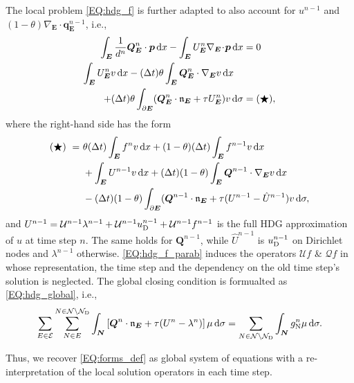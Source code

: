 \documentclass[a4paper, english, 12pt, reqno, draft]{amsart}
\theoremstyle{definition}
\theoremstyle{remark}
\numberwithin{equation}{section}
\newcommand{\setEdge}{\ensuremath{\mathcal E}}
\newcommand{\setNode}{\ensuremath{\mathcal N}}
\newcommand{\setNodeDir}{\ensuremath{\setNode_\textup D}}
\newcommand{\edge}{\ensuremath{E}}
\newcommand{\node}{\ensuremath{N}}
\newcommand{\Edge}{{\ensuremath{\boldsymbol E}}}
\newcommand{\Node}{{\ensuremath{\boldsymbol N}}}
\newcommand{\Nabla}{\ensuremath{\nabla_\Edge}}
\newcommand{\Div}{\ensuremath{\Nabla\!\cdot\!}}
\newcommand{\Normal}{\ensuremath{\mathfrak n_\Edge}}
\renewcommand{\vec}[1]{\ensuremath{\boldsymbol{#1}}}
\newcommand{\dx}{\ensuremath{\, \textup d x}}
\newcommand{\ds}{\ensuremath{\, \textup d \sigma}}
\newcommand{\localU}{\ensuremath{\mathcal U}}
\newcommand{\localQ}{\ensuremath{\vec{\mathcal Q}}}
\newcommand{\deltat}{\ensuremath{(\Delta t)}}
\begin{document}
The local problem \eqref{EQ:hdg_f} is further adapted to also account for $u^{n-1}$ and $(1-\theta) \Div \vec q^{n-1}_\Edge$, i.e.,
% 
\begin{subequations}\label{EQ:hdg_f_parab}
 \begin{align}
  \int_\Edge \frac{1}{d^n} \vec Q^n_\Edge \cdot \vec p \dx - \int_\Edge U^n_\Edge \Div \vec p \dx & = 0 \label{EQ:hdg_f_primary_parab}\\
  \int_\Edge U_\Edge^n v \dx - \deltat \theta \int_\Edge \vec Q^n_\Edge \cdot \Nabla v \dx \quad \notag\\
  + \deltat \theta \int_{\partial \Edge} ( \vec Q^n_\Edge \cdot \Normal + \tau  U^n_\Edge ) v \ds
  & = (\bigstar)\label{EQ:hdg_f_flux_parab},
 \end{align}
\end{subequations}
% 
where the right-hand side has the form
% 
\begin{align*}
 (\bigstar) ~=~ & \theta \deltat \int_{\Edge} f^n v \dx + (1 - \theta) \deltat \int_\Edge f^{n-1} v \dx \\
 & + \int_\Edge U^{n-1} v \dx + \deltat (1-\theta) \int_\Edge \vec Q^{n-1} \cdot \Nabla v \dx \\
 & - \deltat (1-\theta) \int_{\partial \Edge} ( \vec Q^{n-1} \cdot \Normal + \tau  (U^{n-1} - \hat U^{n-1} ) v \ds,
\end{align*}
% 
and $U^{n-1} = \localU^{n-1} \lambda^{n-1} + \localU^{n-1} u^{n-1}_\textup D + \localU^{n-1} f^{n-1}$ is the full HDG approximation of $u$ at time step $n$. The same holds for $\vec Q^{n-1}$, while $\hat U^{n-1}$ is $u^{n-1}_\textup D$ on Dirichlet nodes and $\lambda^{n-1}$ otherwise. \eqref{EQ:hdg_f_parab} induces the operators $\localU f$ \& $\localQ f$ in whose representation, the time step and the dependency on the old time step's solution is neglected. The global closing condition is formualted as \eqref{EQ:hdg_global}, i.e.,
% 
\begin{equation*}
 \sum_{\edge \in \setEdge} \sum^{\node \in \setNode \setminus \setNodeDir}_{\node \in \edge} \int_\Node \left[ \vec Q^n \cdot \Normal + \tau (U^n - \lambda^n) \right] \mu \ds = \sum_{\node \in \setNode \setminus \setNodeDir} \int_\Node g^n_\textup N \mu \ds.
\end{equation*}

Thus, we recover \eqref{EQ:forms_def} as global system of equations with a re-interpretation of the local solution operators in each time step.
\end{document}
